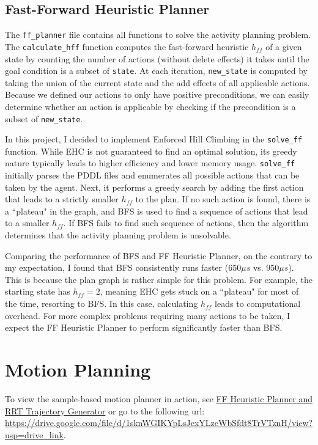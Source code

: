 \documentclass{article}
\begin{document}
\subsection{Fast-Forward Heuristic Planner}

The \texttt{ff\_planner} file contains all functions to solve the activity planning problem. The \texttt{calculate\_hff} function computes the fast-forward heuristic $h_{ff}$ of a given state by counting the number of actions (without delete effects) it takes until the goal condition is a subset of \texttt{state}. At each iteration, \texttt{new\_state} is computed by taking the union of the current state and the add effects of all applicable actions. Because we defined our actions to only have positive preconditions, we can easily determine whether an action is applicable by checking if the precondition is a subset of \texttt{new\_state}.

In this project, I decided to implement Enforced Hill Climbing in the \texttt{solve\_ff} function. While EHC is not guaranteed to find an optimal solution, its greedy nature typically leads to higher efficiency and lower memory usage. \texttt{solve\_ff} initially parses the PDDL files and enumerates all possible actions that can be taken by the agent. Next, it performs a greedy search by adding the first action that leads to a strictly smaller $h_{ff}$ to the plan. If no such action is found, there is a ``plateau" in the graph, and BFS is used to find a sequence of actions that lead to a smaller $h_{ff}$. If BFS fails to find such sequence of actions, then the algorithm determines that the activity planning problem is unsolvable.

Comparing the performance of BFS and FF Heuristic Planner, on the contrary to my expectation, I found that BFS consistently runs faster ($650\mu s$ vs. $950\mu s$). This is because the plan graph is rather simple for this problem. For example, the starting state has $h_{ff}=2$, meaning EHC gets stuck on a ``plateau" for most of the time, resorting to BFS. In this case, calculating $h_{ff}$ leads to computational overhead. For more complex problems requiring many actions to be taken, I expect the FF Heuristic Planner to perform significantly faster than BFS.

\section{Motion Planning}

To view the sample-based motion planner in action, see \href{https://drive.google.com/file/d/1sknWGIKYpLsJexYLzeWbSfdt8TrVTznH/view?usp=sharing}{FF Heuristic Planner and RRT Trajectory Generator} or go to the following url: \url{https://drive.google.com/file/d/1sknWGIKYpLsJexYLzeWbSfdt8TrVTznH/view?usp=drive_link}.
\end{document}
